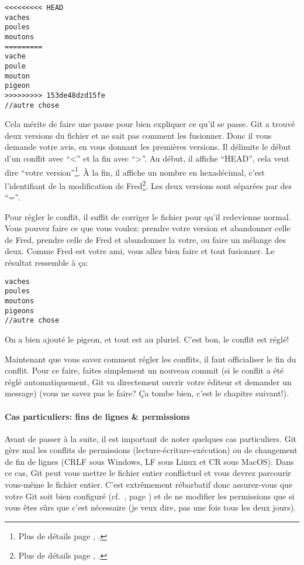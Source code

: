 \documentclass[10pt,a4paper]{article}
\begin{document}
\begin{itemize}
\begin{verbatim}
<<<<<<<<< HEAD
vaches
poules
moutons
=========
vache
poule
mouton
pigeon
>>>>>>>>> 153de48dzd15fe
//autre chose
\end{verbatim}

Cela mérite de faire une pause pour bien expliquer ce qu'il se passe. Git a trouvé deux versions du fichier et ne sait pas comment les fusionner. Donc il vous demande votre avis, en vous donnant les premières versions. Il délimite le début d'un conflit avec ``<'' et la fin avec ``>''. Au début, il affiche ``HEAD'', cela veut dire ``votre version''\footnote{Plus de détails page \pageref{head}, \textit{}.}. À la fin, il affiche un nombre en hexadécimal, c'est l'identifiant de la modification de Fred\footnote{Plus de détails page \pageref{commit}, \textit{}.}. Les deux versions sont séparées par des ``=''.

Pour régler le conflit, il suffit de corriger le fichier pour qu'il redevienne normal. Vous pouvez faire ce que vous voulez: prendre votre version et abandonner celle de Fred, prendre celle de Fred et abandonner la votre, ou faire un mélange des deux. Comme Fred est votre ami, vous allez bien faire et tout fusionner. Le résultat ressemble à ça:

\begin{verbatim}
vaches
poules
moutons
pigeons
//autre chose
\end{verbatim}

On a bien ajouté le pigeon, et tout est au pluriel. C'est bon, le conflit est réglé!
\end{itemize}

Maintenant que vous savez comment régler les conflits, il faut officialiser le fin du conflit. Pour ce faire, faites simplement un nouveau commit (si le conflit a été réglé automatiquement, Git va directement ouvrir votre éditeur et demander un message) (vous ne savez pas le faire? Ça tombe bien, c'est le chapitre suivant!).

\paragraph{Cas particuliers: fins de lignes \& permissions}
Avant de passer à la suite, il est important de noter quelques cas particuliers. Git gère mal les conflits de permissions (lecture-écriture-exécution) ou de changement de fin de lignes (CRLF sous Windows, LF sous Linux et CR sous MacOS). Dans ce cas, Git peut vous mettre le fichier entier conflictuel et vous devrez parcourir vous-même le fichier entier. C'est extrêmement rébarbatif donc assurez-vous que votre Git soit bien configuré (cf.~\textit{}, page \pageref{config}) et de ne modifier les permissions que si vous êtes sûrs que c'est nécessaire (je veux dire, pas une fois tous les deux jours).
\end{document}
